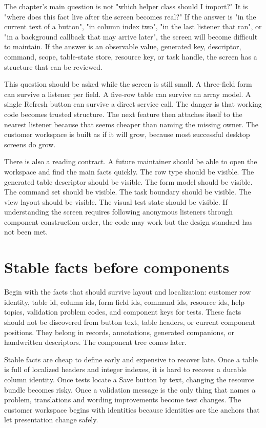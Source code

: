 The chapter's main question is not "which helper class should I import?" It is
"where does this fact live after the screen becomes real?" If the answer is
"in the current text of a button", "in column index two", "in the last
listener that ran", or "in a background callback that may arrive later", the
screen will become difficult to maintain. If the answer is an observable
value, generated key, descriptor, command, scope, table-state store, resource
key, or task handle, the screen has a structure that can be reviewed.

This question should be asked while the screen is still small. A three-field
form can survive a listener per field. A five-row table can survive an array
model. A single Refresh button can survive a direct service call. The danger
is that working code becomes trusted structure. The next feature then attaches
itself to the nearest listener because that seems cheaper than naming the
missing owner. The customer workspace is built as if it will grow, because
most successful desktop screens do grow.

There is also a reading contract. A future maintainer should be able to open
the workspace and find the main facts quickly. The row type should be visible.
The generated table descriptor should be visible. The form model should be
visible. The command set should be visible. The task boundary should be
visible. The view layout should be visible. The visual test state should be
visible. If understanding the screen requires following anonymous listeners
through component construction order, the code may work but the design
standard has not been met.

\section{Stable facts before components}

Begin with the facts that should survive layout and localization: customer row
identity, table id, column ids, form field ids, command ids, resource ids, help
topics, validation problem codes, and component keys for tests. These facts
should not be discovered from button text, table headers, or current component
positions. They belong in records, annotations, generated companions, or
handwritten descriptors. The component tree comes later.

Stable facts are cheap to define early and expensive to recover late. Once a
table is full of localized headers and integer indexes, it is hard to recover
a durable column identity. Once tests locate a Save button by text, changing
the resource bundle becomes risky. Once a validation message is the only thing
that names a problem, translations and wording improvements become test
changes. The customer workspace begins with identities because identities are
the anchors that let presentation change safely.

